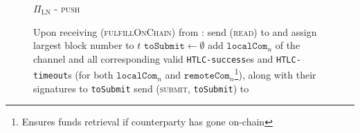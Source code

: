 \begin{figure}[H]
\begin{protocolbox}{$\Pi_{\mathrm{LN}}$ - \textsc{push}}
\begin{algorithmic}[1]
        \State Upon receiving (\textsc{fulfillOnChain}) from \environment:
        \label{alg:protocol:pay:foc:top}
        \Indent
          \State send (\textsc{read}) to \ledger{} and assign largest block
          number to $t$
          \label{alg:protocol:pay:foc:read}
          \State $\mathtt{toSubmit} \gets \emptyset$
          \label{alg:protocol:pay:foc:tosubmit}
              \State add $\mathtt{localCom}_n$ of the channel and all
              corresponding valid \texttt{HTLC-success}es and
              \texttt{HTLC-timeout}s (for both $\mathtt{localCom}_n$ and
              $\mathtt{remoteCom}_n$\footnote{Ensures funds retrieval if
              counterparty has gone on-chain}), along with their signatures to
              \texttt{toSubmit}
            \EndIf
          \EndFor
          \State send (\textsc{submit}, \texttt{toSubmit}) to \ledger
          \label{alg:protocol:pay:foc:submit}
        \EndIndent
      \end{algorithmic}
    \end{protocolbox}
    \caption{}
    \label{alg:protocol:pay:push}
  \end{figure}

